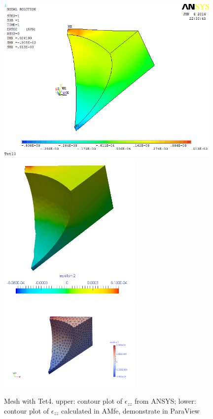 \begin{figure}[htbp]
	\begin{center}
		\includegraphics[width=11cm,clip]{Tet4Ezz.png} 
		\includegraphics[width=7cm,clip]{Tet4EzzPD.png} 				
		\includegraphics[width=7cm,clip]{Tet4EzzP.png} 		
		\caption{Mesh with Tet4. upper: contour plot of $\epsilon_{zz}$ from ANSYS; lower: contour plot of $\epsilon_{zz}$ calculated in AMfe, demonstrate in ParaView} \label{fig: Tet4Ezz}
	\end{center}
\end{figure}
\clearpage 


